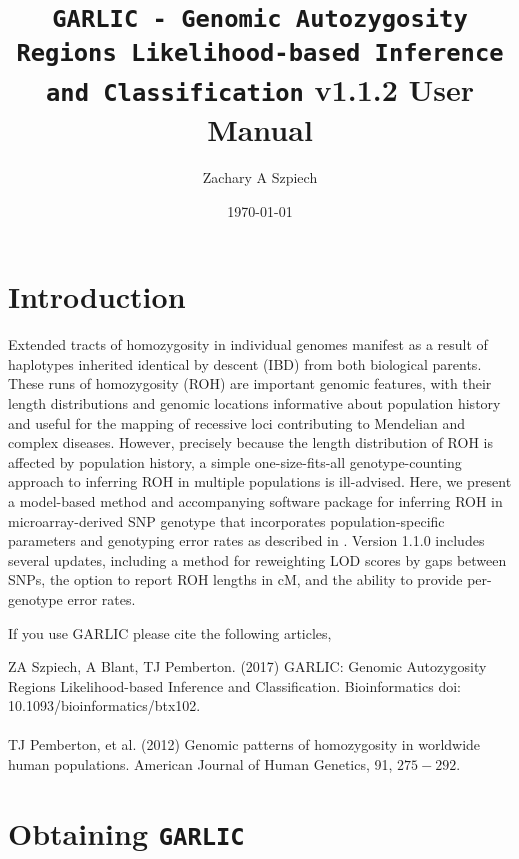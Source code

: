 \documentclass[12pt]{article}%
\title{{\tt GARLIC - Genomic Autozygosity Regions Likelihood-based Inference and Classification} v1.1.2 User Manual}
\date{\today}
\author{Zachary A Szpiech}
\begin{document}
\lstset{breaklines=true,basicstyle=\ttfamily}

\null  %
\nointerlineskip  %
\vfill
\let\snewpage \newpage
\let\newpage \relax
\maketitle
\thispagestyle{empty}
\let \newpage \snewpage
\vfill 
\break %

\tableofcontents 

\newpage

\section{Introduction}

Extended tracts of homozygosity in individual genomes manifest as a result of haplotypes inherited identical by descent (IBD) from both biological parents. These runs of homozygosity (ROH) are important genomic features, with their length distributions and genomic locations informative about population history and useful for the mapping of recessive loci contributing to Mendelian and complex diseases. However, precisely because the length distribution of ROH is affected by population history, a simple one-size-fits-all genotype-counting approach to inferring ROH in multiple populations is ill-advised. Here, we present a model-based method and accompanying software package for inferring ROH in microarray-derived SNP genotype that incorporates population-specific parameters and genotyping error rates as described in \cite{PembertonEtAl12:AJHG}. Version 1.1.0 includes several updates, including a method for reweighting LOD scores by gaps between SNPs, the option to report ROH lengths in cM, and the ability to provide per-genotype error rates.

If you use GARLIC please cite the following articles,

\noindent ZA Szpiech, A Blant, TJ Pemberton. (2017) GARLIC: Genomic Autozygosity Regions Likelihood-based Inference and Classification. Bioinformatics doi: 10.1093/bioinformatics/btx102.
\\\\
TJ Pemberton, et al. (2012) Genomic patterns of homozygosity in worldwide human populations. American Journal of Human Genetics, 91, $275-292$.

\section{Obtaining {\tt GARLIC}}
\end{document}
